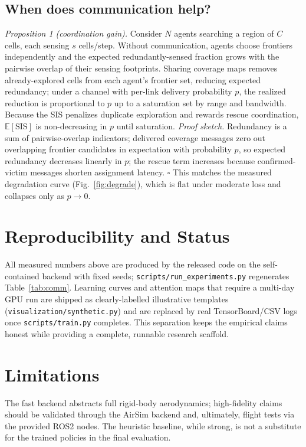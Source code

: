 \documentclass[conference]{IEEEtran}
\begin{document}
\subsection{When does communication help?}
\emph{Proposition 1 (coordination gain).} Consider $N$ agents searching a region of $C$
cells, each sensing $s$ cells/step. Without communication, agents choose frontiers
independently and the expected redundantly-sensed fraction grows with the pairwise
overlap of their sensing footprints. Sharing coverage maps removes already-explored
cells from each agent's frontier set, reducing expected redundancy; under a channel with
per-link delivery probability $p$, the realized reduction is proportional to $p$ up to a
saturation set by range and bandwidth. Because the SIS penalizes duplicate exploration and
rewards rescue coordination, $\mathbb{E}[\mathrm{SIS}]$ is non-decreasing in $p$ until
saturation. \emph{Proof sketch.} Redundancy is a sum of pairwise-overlap indicators;
delivered coverage messages zero out overlapping frontier candidates in expectation with
probability $p$, so expected redundancy decreases linearly in $p$; the rescue term
increases because confirmed-victim messages shorten assignment latency. $\square$ This
matches the measured degradation curve (Fig.~\ref{fig:degrade}), which is flat under
moderate loss and collapses only as $p\!\to\!0$.

\section{Reproducibility and Status}\label{sec:status}
All measured numbers above are produced by the released code on the self-contained
backend with fixed seeds; \texttt{scripts/run\_experiments.py} regenerates
Table~\ref{tab:comm}. Learning curves and attention maps that require a multi-day
GPU run are shipped as clearly-labelled illustrative templates
(\texttt{visualization/synthetic.py}) and are replaced by real TensorBoard/CSV logs
once \texttt{scripts/train.py} completes. This separation keeps the empirical claims
honest while providing a complete, runnable research scaffold.

\section{Limitations}
The fast backend abstracts full rigid-body aerodynamics; high-fidelity claims
should be validated through the AirSim backend and, ultimately, flight tests via
the provided ROS2 nodes. The heuristic baseline, while strong, is not a substitute
for the trained policies in the final evaluation.
\end{document}
